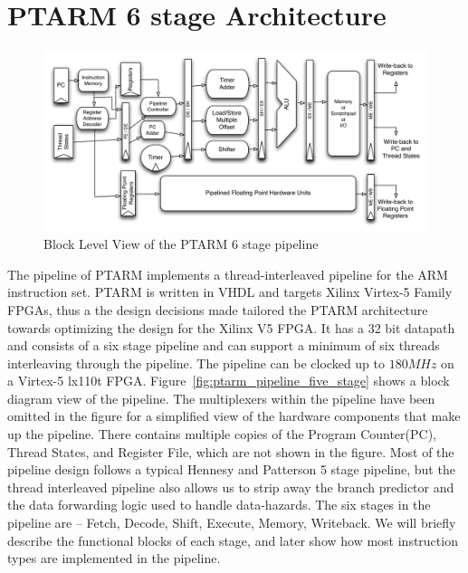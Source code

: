 \section{PTARM 6 stage Architecture}
\begin{figure}
  \vspace{-20pt}
  \begin{center}
    \includegraphics[scale=.6]{figs/ptarm_pipeline_six_stage}
  \end{center}
  \vspace{-20pt}
  \caption{Block Level View of the PTARM 6 stage pipeline}
  \label{fig:ptarm_pipeline_six_stage}
\end{figure}

The pipeline of PTARM implements a thread-interleaved pipeline for the ARM instruction set.
PTARM is written in VHDL and targets Xilinx Virtex-5 Family FPGAs, thus a the design decisions made tailored the PTARM architecture towards optimizing the design for the Xilinx V5 FPGA.
It has a 32 bit datapath and consists of a six stage pipeline and can support a minimum of six threads interleaving through the pipeline.
The pipeline can be clocked up to $180MHz$ on a Virtex-5 lx110t FPGA.  
Figure~\ref{fig:ptarm_pipeline_five_stage} shows a block diagram view of the pipeline. 
The multiplexers within the pipeline have been omitted in the figure for a simplified view of the hardware components that make up the pipeline.
There contains multiple copies of the Program Counter(PC), Thread States, and Register File, which are not shown in the figure.
Most of the pipeline design follows a typical Hennesy and Patterson 5 stage pipeline, but the thread interleaved pipeline also allows us to strip away the branch predictor and the data forwarding logic used to handle data-hazards.
The six stages in the pipeline are -- Fetch, Decode, Shift, Execute, Memory, Writeback.
We will briefly describe the functional blocks of each stage, and later show how most instruction types are implemented in the pipeline.  

